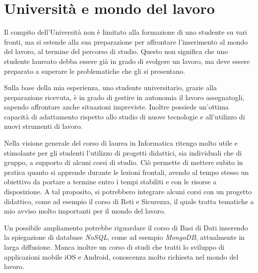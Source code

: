 \section{Università e mondo del lavoro}
Il compito dell'Università non è limitato alla formazione di uno studente su vari fronti, ma si estende alla sua preparazione per affrontare l'inserimento al mondo del lavoro, al termine del percorso di studio. Questo non significa che uno studente laureato debba essere già in grado di svolgere un lavoro, ma deve essere preparato a superare le problematiche che gli si presentano. 

\medskip

Sulla base della mia esperienza, uno studente universitario, grazie alla preparazione ricevuta, è in grado di  gestire in autonomia il lavoro assegnatogli, sapendo affrontare anche situazioni impreviste. Inoltre possiede un'ottima capacità di adattamento rispetto allo studio di nuove tecnologie e all'utilizzo di nuovi strumenti di lavoro.

\medskip

Nella visione generale del corso di laurea in Informatica ritengo molto utile e stimolante per gli studenti l'utilizzo di progetti didattici, sia individuali che di gruppo, a supporto di alcuni corsi di studio. Ciò permette di mettere subito in pratica quanto si apprende durante le lezioni frontali, avendo al tempo stesso un obiettivo da portare a termine entro i tempi stabiliti e con le risorse a disposizione. A tal proposito, si potrebbero integrare alcuni corsi con un progetto didattico, come ad esempio il corso di Reti e Sicurezza, il quale tratta tematiche a mio avviso molto importanti per il mondo del lavoro.

Un possibile ampliamento potrebbe riguardare il corso di Basi di Dati inserendo la spiegazione di database \textit{NoSQL}, come ad esempio \textit{MongoDB}, attualmente in larga diffusione.
Manca inoltre un corso di studi che tratti lo sviluppo di applicazioni mobile iOS e Android, conoscenza molto richiesta nel mondo del lavoro.

\medskip

